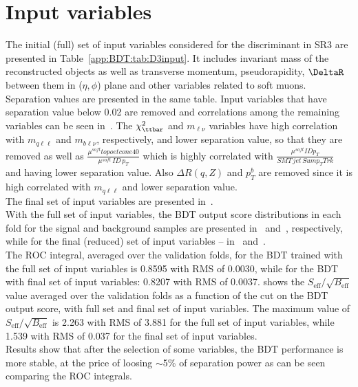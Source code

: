 \section{Input variables}
\indent The initial (full) set of input variables considered for the \Dthree discriminant in SR3 are presented in Table~\ref{app:BDT:tab:D3input}. It includes invariant mass of the reconstructed objects
as well as transverse momentum, pseudorapidity, $\DeltaR$ between them in ($\eta,\phi$) plane and other variables related to soft muons. Separation values are presented in the same table.
Input variables that have separation value below 0.02 are removed and correlations among the remaining variables can be seen in~.
The $\chi^{2}_{\ttbar}$ and $m_{\ell\nu}$ variables have high correlation with $m_{q\ell\ell}$ and $m_{b\ell\nu}$, respectively, and lower separation value, so that they are removed
as well as $\frac{\mu^{soft} topoetcone40}{\mu^{soft}\,ID\,p_{T}}$ which is highly correlated with $\frac{\mu^{soft} ID p_{T}}{SMT\,jet\,Sum p_{T} Trk}$ and having lower separation value.
Also $\Delta R(q,Z)$ and $p_{T}^{b}$ are removed since it is high correlated with $m_{q\ell\ell}$ and lower separation value.\\
The final set of input variables are presented in~.\\
With the full set of input variables, the BDT output score distributions in each fold for the signal and background samples are presented in~
and~, respectively, while for the final (reduced) set of input variables -- in~
and~.\\
The ROC integral, averaged over the validation folds, for the BDT trained with the full set of input variables is 0.8595 with RMS of 0.0030,
while for the BDT with final set of input variables: 0.8207 with RMS of 0.0037.
 shows the $S_{\text{eff}}/\sqrt{B_{\text{eff}}}$ value averaged over the validation folds as a function of the cut on the BDT output score, with full set and final set of input variables.
The maximum value of $S_{\text{eff}}/\sqrt{B_{\text{eff}}}$ is 2.263 with RMS of 3.881 for the full set of input variables, while 1.539 with RMS of 0.037 for the final set of input variables.\\
Results show that after the selection of some variables, the BDT performance is more stable, at the price of loosing $\sim$5\% of separation power as can be seen comparing the ROC integrals. 

